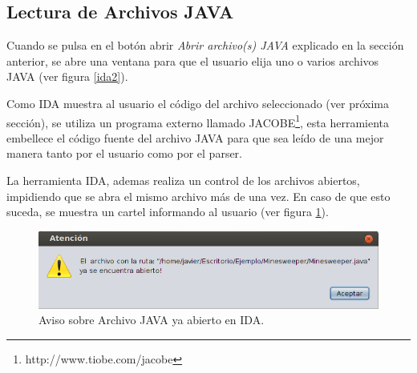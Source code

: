 \documentclass[a4paper,12pt]{report}
\begin{document}
\subsection{Lectura de Archivos JAVA}

Cuando se pulsa en el botón abrir \textit{Abrir archivo(s) JAVA} explicado en la sección anterior, se abre una ventana para que el usuario elija uno o varios archivos JAVA (ver figura \ref{ida2}). 


Como IDA muestra al usuario el código del archivo seleccionado (ver próxima sección), se utiliza un programa externo llamado JACOBE\footnote[1]{http://www.tiobe.com/jacobe}, esta herramienta embellece el código fuente del archivo JAVA para que sea leído de una mejor manera tanto por el usuario como por el parser. 


La herramienta IDA, ademas realiza un control de los archivos abiertos, impidiendo que se abra el mismo archivo más de una vez. En caso de que esto suceda, se muestra un cartel informando al usuario (ver figura \ref{idaWar2}).


\begin{figure}[t] %
\centerline{%
\includegraphics[scale= 0.8]{./ida_war_02.png}
}
\caption{Aviso sobre Archivo JAVA ya abierto en IDA.}
\label{idaWar2}
\end{figure}
\end{document}
